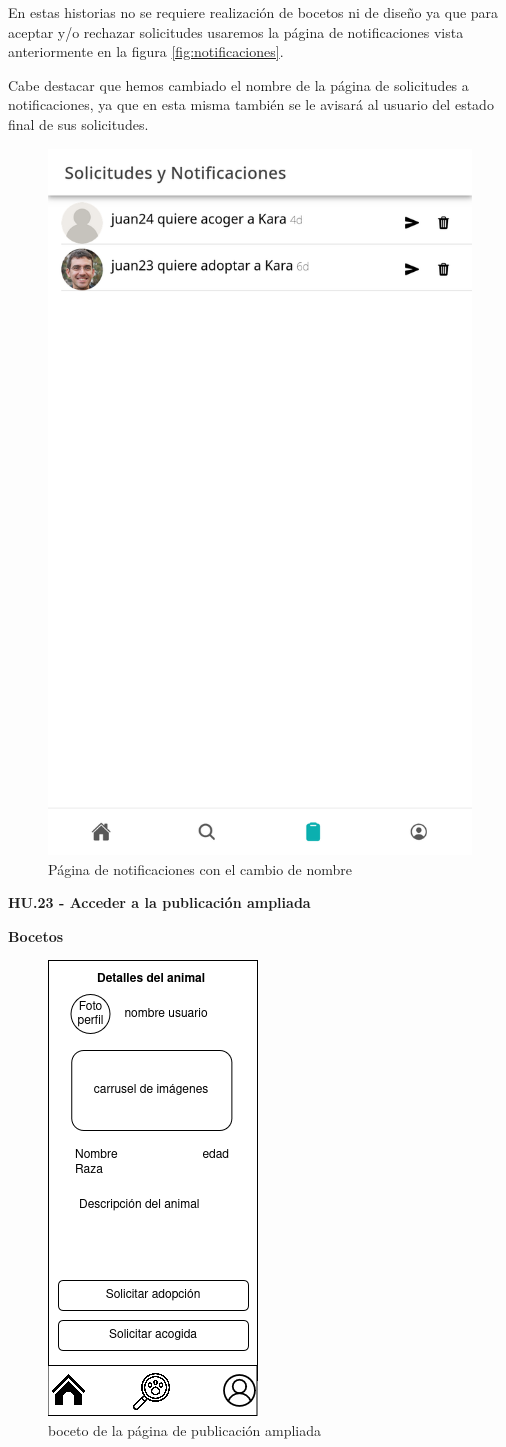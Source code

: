En estas historias no se requiere realización de bocetos ni de diseño ya que para aceptar y/o rechazar solicitudes usaremos la página de notificaciones vista anteriormente en la figura \ref{fig:notificaciones}. 

Cabe destacar que hemos cambiado el nombre de la página de solicitudes a notificaciones, ya que en esta misma también se le avisará al usuario del estado final de sus solicitudes.

\begin{figure}[H]
	\centering
	\includegraphics[width=0.5\linewidth]{"sprint 4/hu17/notificacionesNueva"}
	\caption{Página de notificaciones con el cambio de nombre}
	\label{fig:notificacionesnueva}
\end{figure}


\Large{\textbf{HU.23 - Acceder a la publicación ampliada}}

\textbf{Bocetos}

\begin{figure}[H]
	\centering
	\includegraphics[width=0.31\linewidth]{"sprint 4/hu23/publicacionAmpliada"}
	\caption{boceto de la página de publicación ampliada}
	\label{fig:publicacionampliada}
\end{figure}

